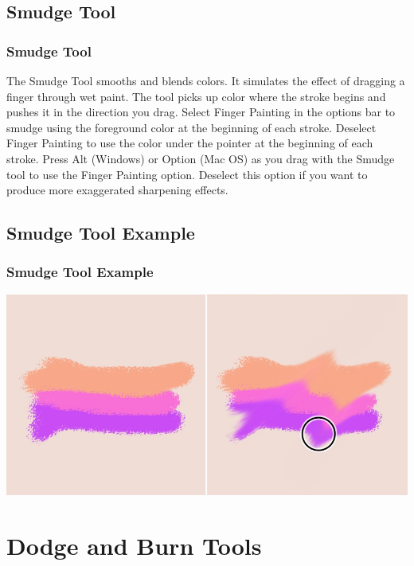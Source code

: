 \documentclass{beamer}
\begin{document}
			\subsection{Smudge Tool}		
			\begin{frame}
				\frametitle{Smudge Tool}
				\begin{outline}
					\1 The Smudge Tool smooths and blends colors.
					\1 It simulates the effect of dragging a finger through wet paint.
					\1 The tool picks up color where the stroke begins and pushes it in the direction you drag.
					\1 Select Finger Painting in the options bar to smudge using the foreground color at the beginning of each stroke. 
					\2 Deselect Finger Painting to use the color under the pointer at the beginning of each stroke.
					\2 Press Alt (Windows) or Option (Mac OS) as you drag with the Smudge tool to use the Finger Painting option.
					\2 Deselect this option if you want to produce more exaggerated sharpening effects.
				\end{outline}
			\end{frame}
		
		\subsection{Smudge Tool Example}		
		\begin{frame}
			\frametitle{Smudge Tool Example}
			\includegraphics[width=1.0\textwidth]{images/smudge tool.png}
		\end{frame}
			
		\section{Dodge and Burn Tools}
\end{document}
